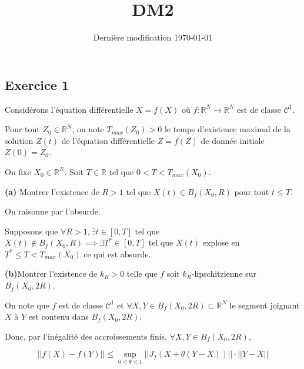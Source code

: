 \documentclass[french]{article}
\begin{document}
	\title{DM2}
	\date{Dernière modification \today}
	
	\maketitle
	
	\subsection*{Exercice 1}
	
	\begin{tcolorbox}[colback=red!5!white,colframe=red!75!black]
		Considérons l'équation différentielle $\dot{X} = f(X)$ où $f : \mathbb{R}^N \to \mathbb{R}^N$ est de classe $\mathcal{C}^1$.
		
		Pour tout $Z_0 \in \mathbb{R}^N$, on note $T_{max}(Z_0) > 0$ le temps d'existence maximal de la solution $Z(t)$ de l'équation différentielle $\dot{Z} = f(Z)$ de donnée initiale $Z(0) = Z_0$.
		
		On fixe $X_0 \in \mathbb{R}^N$. Soit $T \in \mathbb{R}$ tel que $0 < T < T_{max}(X_0)$.
	\end{tcolorbox}
	
	\begin{tcolorbox}[colback=gray!5!white,colframe=gray!75!black]
		\textbf{\large{(a)}} Montrer l'existence de $R > 1$ tel que $X(t) \in B_f(X_0, R)$ pour tout $t \leq T$.  
	\end{tcolorbox}

	On raisonne par l'absurde.
	
	Supposons que $ \forall R > 1, \exists t \in [0, T]$ tel que $X(t) \not\in B_f(X_0, R) \implies \exists T^* \in [0, T]$ tel que $X(t)$ explose en $T^* \leq T < T_{max}(X_0)$ ce qui est absurde.

	\begin{tcolorbox}[colback=gray!5!white,colframe=gray!75!black]
		\textbf{\large{(b)}}Montrer l'existence de $k_R > 0$ telle que $f$ soit $k_R$-lipschitzienne sur $B_f(X_0, 2R)$. 
	\end{tcolorbox}

	On note que $f$ est de classe $\mathcal{C}^1$ et $\forall X,Y \in B_f(X_0, 2R) \subset \mathbb{R}^N$ le segment joignant $X$ à $Y$ est contenu dans $B_f(X_0, 2R)$.

	Donc, par l'inégalité des accroissements finis, $\forall X,Y \in B_f(X_0, 2R)$,
	
	\[|| f(X) - f(Y)|| \leq \sup_{0\leq \theta \leq 1} || J_f(X + \theta(Y - X)) || \cdot ||Y - X||\]
	
\end{document}
